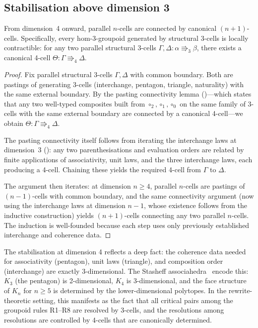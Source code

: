 \documentclass[manuscript]{BSLstyle}
\begin{document}
\subsection{Stabilisation above dimension 3}

\begin{theorem}[Stabilisation]\label{thm:stabilisation}
From dimension~4 onward, parallel $n$-cells are connected by canonical
$(n+1)$-cells.  Specifically, every hom-3-groupoid generated by
structural 3-cells is locally contractible: for any two parallel
structural 3-cells $\Gamma, \Delta : \alpha \Rrightarrow_3 \beta$,
there exists a canonical 4-cell $\Theta : \Gamma \Rrightarrow_4 \Delta$.
\end{theorem}

\begin{proof}
Fix parallel structural 3-cells $\Gamma, \Delta$ with common boundary.
Both are pastings of generating 3-cells (interchange, pentagon, triangle,
naturality) with the same external boundary.
By the pasting connectivity lemma ()---which states that
any two well-typed composites built from $\circ_2, \circ_1, \circ_0$ on the
same family of 3-cells with the same external boundary are connected by a
canonical 4-cell---we obtain $\Theta : \Gamma \Rrightarrow_4 \Delta$.

The pasting connectivity itself follows from iterating the interchange
laws at dimension~3 (): any two parenthesisations
and evaluation orders are related by finite applications of associativity,
unit laws, and the three interchange laws, each producing a 4-cell.
Chaining these yields the required 4-cell from $\Gamma$ to $\Delta$.

The argument then iterates: at dimension $n \geq 4$, parallel $n$-cells
are pastings of $(n-1)$-cells with common boundary, and the same
connectivity argument (now using the interchange laws at dimension
$n-1$, whose existence follows from the inductive construction) yields
$(n+1)$-cells connecting any two parallel $n$-cells.  The induction is
well-founded because each step uses only previously established
interchange and coherence data.
\end{proof}

\begin{remark}
The stabilisation at dimension 4 reflects a deep fact: the coherence
data needed for associativity (pentagon), unit laws (triangle), and
composition order (interchange) are exactly 3-dimensional.  The Stasheff
associahedra~\cite{Stasheff63} encode this: $K_3$ (the pentagon) is
2-dimensional, $K_4$ is 3-dimensional, and the face structure of $K_n$
for $n \geq 5$ is determined by the lower-dimensional polytopes.
In the rewrite-theoretic setting, this manifests as the fact that all
critical pairs among the groupoid rules R1--R8 are resolved by 3-cells,
and the resolutions among resolutions are controlled by 4-cells that
are canonically determined.
\end{remark}
\end{document}
